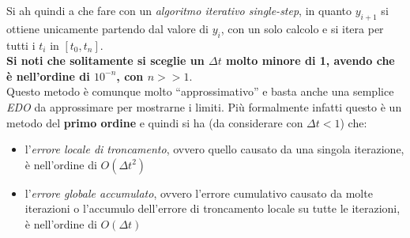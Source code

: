\documentclass[a4paper,12pt, oneside]{book}
\begin{document}
Si ah quindi a che fare con un \textit{algoritmo iterativo single-step}, in
quanto $y_{i+1}$ si ottiene unicamente partendo dal valore di $y_i$, con un solo
calcolo e si itera per tutti i $t_i$ in $[t_0,t_n]$. \\
\textbf{Si noti che solitamente si sceglie un $\Delta t$ molto minore di 1,
  avendo che è nell'ordine di $10^{-n}$, con $n>>1$}.\\
Questo metodo è comunque molto ``approssimativo'' e basta anche una semplice
\textit{EDO} da approssimare per mostrarne i limiti. Più formalmente infatti
questo è un metodo del \textbf{primo ordine} e quindi si ha (da considerare
con $\Delta t<1$) che:
\begin{itemize}
  \item l'\textit{errore locale di troncamento}, ovvero quello causato da una
  singola iterazione, è nell'ordine di $O(\Delta t^2)$
  \item l'\textit{errore globale accumulato}, ovvero l'errore cumulativo
  causato da molte iterazioni o l'accumulo dell'errore di troncamento locale su
  tutte le iterazioni, è nell'ordine di $O(\Delta t)$ 
\end{itemize}
\end{document}
